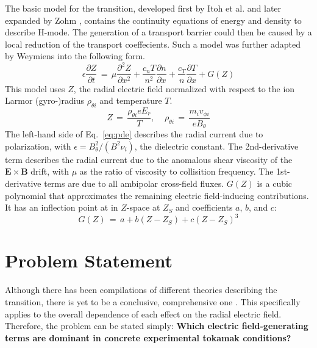 \documentclass[a4paper]{article}
\begin{document}
The basic model for the transition, developed first by Itoh et al. \cite{itoh_edge_1991} and later expanded by Zohm \cite{zohm_dynamic_1994}, contains the continuity equations of energy and density to describe H-mode.
The generation of a transport barrier could then be caused by a local reduction of the transport coeffecients.
Such a model was further adapted by Weymiens \cite{weymiens_bifurcation_2014} into the following form.
\begin{equation}
	\epsilon \frac{\partial Z}{\partial t} \,=\, \mu \frac{\partial^2 Z}{\partial x^2} + \frac{c_n T}{n^2} \frac{\partial n}{\partial x} + \frac{c_T}{n} \frac{\partial T}{\partial x} + G(Z)
	\label{eq:pde}
\end{equation}
This model uses $Z$, the radial electric field normalized with respect to the ion Larmor (gyro-)radius $\rho_{\theta i}$ and temperature $T$.
\begin{equation}
	Z \,=\, \frac{\rho_{\theta i} e E_r}{T}, ~~~~~ \rho_{\theta i} \,=\, \frac{m_i v_{\phi i}}{e B_\theta}
	\label{eq:normalization}
\end{equation}
The left-hand side of Eq.~\ref{eq:pde} describes the radial current due to polarization, with $\epsilon = B_\theta^2 / (B^2 \nu_i)$, the dielectric constant.
The 2nd-derivative term describes the radial current due to the anomalous shear viscosity of the $\mathbf{E}\times\mathbf{B}$ drift, with $\mu$ as the ratio of viscosity to collisition frequency.
The 1st-derivative terms are due to all ambipolar cross-field fluxes.
$G(Z)$ is a cubic polynomial that approximates the remaining electric field-inducing contributions.
It has an inflection point at in $Z$-space at $Z_S$ and coefficients $a$, $b$, and $c$:
\begin{equation}
	G(Z) \,=\, a + b(Z - Z_S) + c(Z - Z_S)^3
\end{equation}


\section{Problem Statement}
Although there has been compilations of different theories describing the transition, there is yet to be a conclusive, comprehensive one \cite{connor_review_2000}.
This specifically applies to the overall dependence of each effect on the radial electric field.
Therefore, the problem can be stated simply: \textbf{Which electric field-generating terms are dominant in concrete experimental tokamak conditions?}
\end{document}
